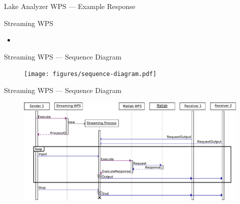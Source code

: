 \documentclass[xcolor=svgnames,professionalfonts,11pt,aspectratio=43,handout]{beamer}
\begin{document}
\begin{frame}[c,fragile]{Lake Analyzer WPS --- Example Response}
\begin{figure}
  \end{figure}
\end{frame}


\begin{frame}[t]{Streaming WPS}
  \begin{itemize}
    \item
  \end{itemize}
\end{frame}

\begin{frame}[c,fragile]{Streaming WPS --- Sequence Diagram}
  \begin{figure}
    \begin{center}
      \texttt{[image: figures/sequence-diagram.pdf]}
    \end{center}
  \end{figure}
\end{frame}

\begin{frame}[c,fragile]{Streaming WPS --- Sequence Diagram}
  \begin{figure}
    \begin{center}
      \includegraphics[width=\textwidth]{figures/sequence-diagram2.pdf}
    \end{center}
  \end{figure}
\end{frame}
\end{document}
